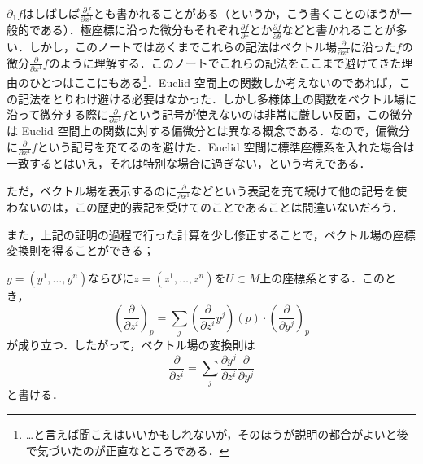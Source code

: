 \begin{dig}$\partial_1 f$はしばしば$\frac{\partial f}{\partial x^1}$とも書かれることがある（というか，こう書くことのほうが一般的である）．極座標に沿った微分もそれぞれ$\frac{\partial f}{\partial r}$とか$\frac{\partial f}{\partial \theta}$などと書かれることが多い．しかし，このノートではあくまでこれらの記法はベクトル場$\frac{\partial}{\partial x^1}$に沿った$f$の微分$\frac{\partial}{\partial x^1}f$のように理解する．このノートでこれらの記法をここまで避けてきた理由のひとつはここにもある\footnote{…と言えば聞こえはいいかもしれないが，そのほうが説明の都合がよいと後で気づいたのが正直なところである．}．Euclid 空間上の関数しか考えないのであれば，この記法をとりわけ避ける必要はなかった．しかし多様体上の関数をベクトル場に沿って微分する際に$\frac{\partial}{\partial x^1}f$という記号が使えないのは非常に厳しい反面，この微分は Euclid 空間上の関数に対する偏微分とは異なる概念である．なので，偏微分に$\frac{\partial}{\partial x^1}f$という記号を充てるのを避けた．Euclid 空間に標準座標系を入れた場合は一致するとはいえ，それは特別な場合に過ぎない，という考えである．

ただ，ベクトル場を表示するのに$\frac{\partial}{\partial x^1}$などという表記を充て続けて他の記号を使わないのは，この歴史的表記を受けてのことであることは間違いないだろう．
\end{dig}

また，上記の証明の過程で行った計算を少し修正することで，ベクトル場の座標変換則を得ることができる；

\begin{prop}
$y=(y^1, \dots, y^n)$ならびに$z = (z^1,\dots, z^n)$を$U \subset M$上の座標系とする．このとき，
\begin{equation}
\left( \frac{\partial}{\partial z^i} \right)_p = \sum_{j} \left( \frac{\partial }{\partial z^i} y^j \right) (p) \cdot \left( \frac{\partial}{\partial y^j} \right)_p
\end{equation}が成り立つ．したがって，ベクトル場の変換則は
\begin{equation}
\frac{\partial}{\partial z^i} = \sum_{j} \frac{\partial y^j}{\partial z^i} \frac{\partial}{\partial y^j}
\end{equation}と書ける．
\end{prop}

